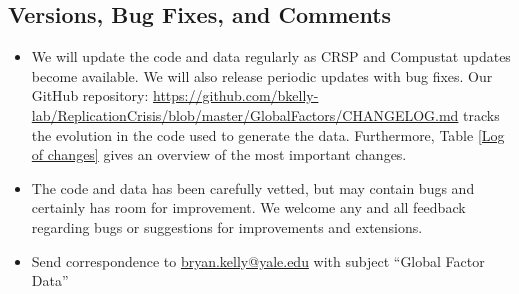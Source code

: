 \documentclass[12pt,title,fleqn]{article}
\begin{document}
\subsection{Versions, Bug Fixes, and Comments}
    \begin{itemize}
    \item We will update the code and data regularly as CRSP and Compustat updates become available.  We will also release periodic updates with bug fixes. Our GitHub repository: \url{https://github.com/bkelly-lab/ReplicationCrisis/blob/master/GlobalFactors/CHANGELOG.md} tracks the evolution in the code used to generate the data. Furthermore, Table \ref{Log of changes} gives an overview of the most important changes.
    \item The code and data has been carefully vetted, but may contain bugs and certainly has room for improvement.  We welcome any and all feedback regarding bugs or suggestions for improvements and extensions.
    \item Send correspondence to \href{mailto:bryan.kelly@yale.edu}{bryan.kelly@yale.edu} with subject ``Global Factor Data''
    \end{itemize}

\end{document}
